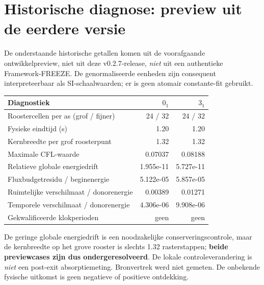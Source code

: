 \documentclass[10pt,a4paper]{article}
\begin{document}
\section{Historische diagnose: preview uit de eerdere versie}
De onderstaande historische getallen komen uit de voorafgaande ontwikkelpreview, niet uit deze v0.2.7-release, \emph{niet} uit een authentieke Framework-FREEZE. De genormaliseerde eenheden zijn consequent interpreteerbaar als SI-schaalwaarden; er is geen atomair constante-fit gebruikt.
\begin{center}\begin{tabular}{lrr}\toprule
Diagnostiek & $0_1$ & $3_1$\\\midrule
Roostercellen per as (grof / fijner) & 24 / 32 & 24 / 32\\
Fysieke eindtijd (s) & 1.20 & 1.20\\
Kernbreedte per grof roosterpunt & 1.32 & 1.32\\
Maximale CFL-waarde & 0.07037 & 0.08188\\
Relatieve globale energiedrift & 1.955e-11 & 5.727e-11\\
Fluxbudgetresidu / beginenergie & 5.122e-05 & 5.857e-05\\
Ruimtelijke verschilmaat / donorenergie & 0.00389 & 0.01271\\
Temporele verschilmaat / donorenergie & 4.306e-06 & 9.908e-06\\
Gekwalificeerde klokperioden & geen & geen\\\bottomrule
\end{tabular}\end{center}
De geringe globale energiedrift is een noodzakelijke conserveringscontrole, maar de kernbreedte op het grove rooster is slechts 1.32 rasterstappen; \textbf{beide previewcases zijn dus ondergeresolveerd}. De lokale controleverandering is \emph{niet} een post-exit absorptiemeting. Bronvertrek werd niet gemeten. De onbekende fysische uitkomst is geen negatieve of positieve ontdekking.
\end{document}
